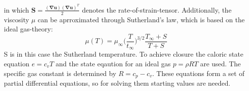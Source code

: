 \documentclass[11pt,a4paper,openany,oneside,parskip=half*]{article}
\renewcommand*\vec[1]{\boldsymbol{#1}}
\renewcommand*\matrix[1]{\boldsymbol{#1}}
\begin{document}
in which $ \matrix{S} = \frac{(\vec\nabla \vec{u})(\vec\nabla \vec{u})^T}{2} $ denotes the rate-of-strain-tensor. Additionally, the viscosity
$ \mu $ can be aprroximated through Sutherland's law, which is based on the ideal gas-theory: 
\begin{equation}
 \mu (T) = \mu_\infty \biggl(\frac{T}{t_\infty}\biggl)^{3/2} \frac{T_\infty + S}{T + S}
\end{equation}
S is in this case the Sutherland temperature.
To achieve closure the caloric state equation $ e = c_v T $ and the state eqaution for an ideal gas $
p = \rho R T $ are used. The specific gas constant is determined by $ R = c_p - c_v $. 
These equations form a set of partial differential equations, so for solving them starting values are needed.
\pagebreak
\end{document}

